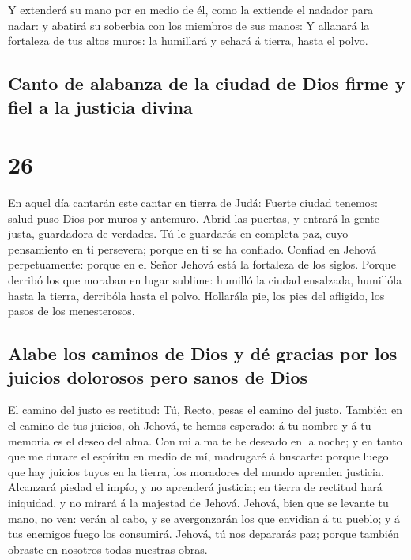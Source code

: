  Y extenderá su mano por en medio de él, como la extiende
el nadador para nadar: y abatirá su soberbia con los miembros de sus
manos:  Y allanará la fortaleza de tus altos muros: la
humillará y echará á tierra, hasta el polvo.

\hypertarget{canto-de-alabanza-de-la-ciudad-de-dios-firme-y-fiel-a-la-justicia-divina}{%
\subsection{Canto de alabanza de la ciudad de Dios firme y fiel a la
justicia
divina}\label{canto-de-alabanza-de-la-ciudad-de-dios-firme-y-fiel-a-la-justicia-divina}}

\hypertarget{section-25}{%
\section{26}\label{section-25}}

 En aquel día cantarán este cantar en tierra de Judá:
Fuerte ciudad tenemos: salud puso Dios por muros y antemuro.
 Abrid las puertas, y entrará la gente justa, guardadora
de verdades.  Tú le guardarás en completa paz, cuyo
pensamiento en ti persevera; porque en ti se ha confiado. 
Confiad en Jehová perpetuamente: porque en el Señor Jehová está la
fortaleza de los siglos.  Porque derribó los que moraban
en lugar sublime: humilló la ciudad ensalzada, humillóla hasta la
tierra, derribóla hasta el polvo.  Hollarála pie, los pies
del afligido, los pasos de los menesterosos.

\hypertarget{alabe-los-caminos-de-dios-y-duxe9-gracias-por-los-juicios-dolorosos-pero-sanos-de-dios}{%
\subsection{Alabe los caminos de Dios y dé gracias por los juicios
dolorosos pero sanos de
Dios}\label{alabe-los-caminos-de-dios-y-duxe9-gracias-por-los-juicios-dolorosos-pero-sanos-de-dios}}

 El camino del justo es rectitud: Tú, Recto, pesas el
camino del justo.  También en el camino de tus juicios, oh
Jehová, te hemos esperado: á tu nombre y á tu memoria es el deseo del
alma.  Con mi alma te he deseado en la noche; y en tanto
que me durare el espíritu en medio de mí, madrugaré á buscarte: porque
luego que hay juicios tuyos en la tierra, los moradores del mundo
aprenden justicia.  Alcanzará piedad el impío, y no
aprenderá justicia; en tierra de rectitud hará iniquidad, y no mirará á
la majestad de Jehová.  Jehová, bien que se levante tu
mano, no ven: verán al cabo, y se avergonzarán los que envidian á tu
pueblo; y á tus enemigos fuego los consumirá.  Jehová, tú
nos depararás paz; porque también obraste en nosotros todas nuestras
obras.

